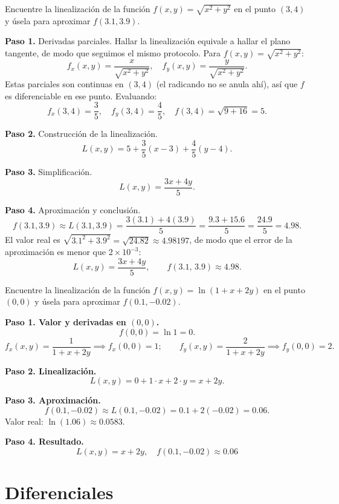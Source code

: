 \begin{example}
Encuentre la linealización de la función $f(x, y) = \sqrt{x^2 + y^2}$ en el punto $(3, 4)$ y úsela para aproximar $f(3.1, 3.9)$.
\begin{myproof}
\textbf{Paso 1.} Derivadas parciales. Hallar la linealización equivale a hallar
el plano tangente, de modo que seguimos el mismo protocolo. Para
$f(x,y)=\sqrt{x^2+y^2}$:
\[
f_x(x, y) = \frac{x}{\sqrt{x^2 + y^2}}, \quad f_y(x, y) = \frac{y}{\sqrt{x^2 + y^2}}.
\]
Estas parciales son continuas en $(3,4)$ (el radicando no se anula ahí), así que
$f$ es diferenciable en ese punto. Evaluando:
\[
f_x(3, 4) = \frac{3}{5}, \quad f_y(3, 4) = \frac{4}{5}, \quad f(3, 4) = \sqrt{9+16} = 5.
\]

\textbf{Paso 2.} Construcción de la linealización.
\[
L(x, y) = 5 + \frac{3}{5}(x - 3) + \frac{4}{5}(y - 4).
\]

\textbf{Paso 3.} Simplificación.
\[
L(x, y) = \frac{3x + 4y}{5}.
\]

\textbf{Paso 4.} Aproximación y conclusión.
\[
f(3.1, 3.9) \approx L(3.1, 3.9) = \frac{3(3.1) + 4(3.9)}{5} = \frac{9.3 + 15.6}{5} = \frac{24.9}{5} = 4.98.
\]
El valor real es $\sqrt{3.1^2 + 3.9^2} = \sqrt{24.82} \approx 4.98197$, de modo que
el error de la aproximación es menor que $2\times 10^{-3}$:
\[
\boxed{L(x,y)=\frac{3x+4y}{5},\qquad f(3.1,\,3.9)\approx 4.98.}
\]
\end{myproof}
\end{example}

\begin{prob}
Encuentre la linealización de la función $f(x, y) = \ln(1 + x + 2y)$ en el punto $(0, 0)$ y úsela para aproximar $f(0.1, -0.02)$.
\begin{myproof}
\textbf{Paso 1. Valor y derivadas en $(0,0)$.}
\[
f(0,0)=\ln 1=0.
\]
\[
f_x(x,y)=\frac{1}{1+x+2y}\implies f_x(0,0)=1;\qquad
f_y(x,y)=\frac{2}{1+x+2y}\implies f_y(0,0)=2.
\]

\textbf{Paso 2. Linealización.}
\[
L(x,y)=0+1\cdot x+2\cdot y=x+2y.
\]

\textbf{Paso 3. Aproximación.}
\[
f(0.1,-0.02)\approx L(0.1,-0.02)=0.1+2(-0.02)=0.06.
\]
Valor real: $\ln(1.06)\approx 0.0583$.

\textbf{Paso 4. Resultado.}
\[
\boxed{L(x,y)=x+2y,\quad f(0.1,-0.02)\approx 0.06}
\]
\end{myproof}
\end{prob}

\section{Diferenciales}

